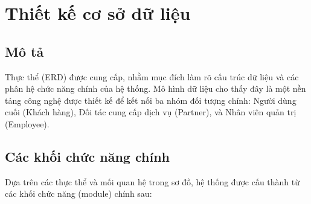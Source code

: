 \section{Thiết kế cơ sở dữ liệu}
\subsection{Mô tả}
Thực thể (ERD) được cung cấp, nhằm mục đích làm rõ cấu trúc dữ liệu và các phân hệ chức năng chính của hệ thống. Mô hình dữ liệu cho thấy đây là một nền tảng công nghệ được thiết kế để kết nối ba nhóm đối tượng chính: Người dùng cuối (Khách hàng), Đối tác cung cấp dịch vụ (Partner), và Nhân viên quản trị (Employee).
\subsection{Các khối chức năng chính}
 Dựa trên các thực thể và mối quan hệ trong sơ đồ, hệ thống được cấu thành từ các khối chức năng (module) chính sau:
